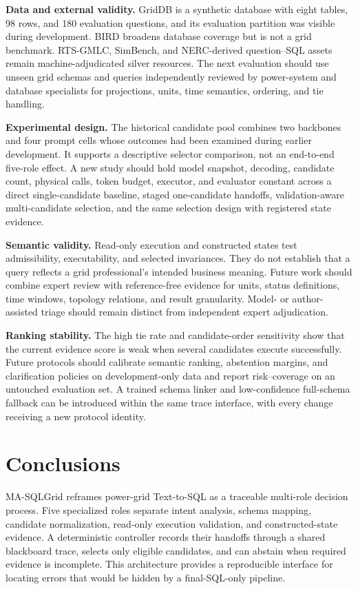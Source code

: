 \documentclass[applsci,article,submit,moreauthors]{Definitions/mdpi}
\newcommand{\masql}{MA-SQLGrid}
\begin{document}
\textbf{Data and external validity.} GridDB is a synthetic database with eight tables, 98 rows, and 180 evaluation questions, and its evaluation partition was visible during development. BIRD broadens database coverage but is not a grid benchmark. RTS-GMLC, SimBench, and NERC-derived question--SQL assets remain machine-adjudicated silver resources. The next evaluation should use unseen grid schemas and queries independently reviewed by power-system and database specialists for projections, units, time semantics, ordering, and tie handling.

\textbf{Experimental design.} The historical candidate pool combines two backbones and four prompt cells whose outcomes had been examined during earlier development. It supports a descriptive selector comparison, not an end-to-end five-role effect. A new study should hold model snapshot, decoding, candidate count, physical calls, token budget, executor, and evaluator constant across a direct single-candidate baseline, staged one-candidate handoffs, validation-aware multi-candidate selection, and the same selection design with registered state evidence.

\textbf{Semantic validity.} Read-only execution and constructed states test admissibility, executability, and selected invariances. They do not establish that a query reflects a grid professional's intended business meaning. Future work should combine expert review with reference-free evidence for units, status definitions, time windows, topology relations, and result granularity. Model- or author-assisted triage should remain distinct from independent expert adjudication.

\textbf{Ranking stability.} The high tie rate and candidate-order sensitivity show that the current evidence score is weak when several candidates execute successfully. Future protocols should calibrate semantic ranking, abstention margins, and clarification policies on development-only data and report risk--coverage on an untouched evaluation set. A trained schema linker and low-confidence full-schema fallback can be introduced within the same trace interface, with every change receiving a new protocol identity.

\section{Conclusions}

\masql{} reframes power-grid Text-to-SQL as a traceable multi-role decision process. Five specialized roles separate intent analysis, schema mapping, candidate normalization, read-only execution validation, and constructed-state evidence. A deterministic controller records their handoffs through a shared blackboard trace, selects only eligible candidates, and can abstain when required evidence is incomplete. This architecture provides a reproducible interface for locating errors that would be hidden by a final-SQL-only pipeline.
\end{document}
